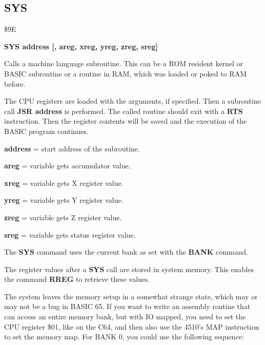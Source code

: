 
\newpage
\subsection{SYS}
\begin{description}[leftmargin=2cm,style=nextline]
\item [Token:] \$9E
\item [Format:] {\bf SYS address [, areg, xreg, yreg, zreg, sreg]}
\item [Usage:]  Calls a machine language subroutine.
                This can be a ROM resident kernel or BASIC subroutine
                or a routine in RAM, which was loaded or poked
                to RAM before.

               The CPU registers are loaded with the arguments,
               if specified. Then a subroutine call {\bf JSR address}
               is performed. The called routine should exit with
               a {\bf RTS} instruction. Then the register contents
               will be saved and the execution of the BASIC program
               continues.

               {\bf address} = start address of the subroutine.

               {\bf areg} = variable gets accumulator value.

               {\bf xreg} = variable gets X register value.

               {\bf yreg} = variable gets Y register value.

               {\bf zreg} = variable gets Z register value.

               {\bf sreg} = variable gets status register value.

                 The {\bf SYS} command uses the current bank
                 as set with the {\bf BANK} command.

\item [Remarks:] The register values after a {\bf SYS} call are stored
                 in system memory. This enables the command
                 {\bf RREG} to retrieve these values.

\item [Remarks:] The system leaves the memory setup in a somewhat
  strange state, which may or may not be a bug in BASIC 65.
  If you want to write an assembly routine that can
  access an entire memory bank, but with IO mapped, you need to set
  the CPU register \$01, like on the C64, and then also use the 4510's
  MAP instruction to set the memory map.  For BANK 0, you could use
  the following sequence:


\end{description}
